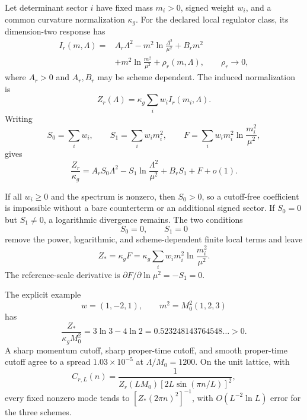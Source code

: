 Let determinant sector \(i\) have fixed mass \(m_i>0\), signed weight \(w_i\),
and a common curvature normalization \(\kappa_g\).  For the declared local
regulator class, its dimension-two response has
\begin{align}
 I_r(m,\Lambda)
={}&A_r\Lambda^2
 -m^2\ln\frac{\Lambda^2}{\mu^2}
 +B_rm^2\nonumber\\
 &+m^2\ln\frac{m^2}{\mu^2}
 +\rho_r(m,\Lambda),\qquad \rho_r\to0 ,
\label{eq:three-regulator-class}
\end{align}
where \(A_r>0\) and \(A_r,B_r\) may be scheme dependent.  The induced
normalization is
\begin{equation}
 Z_r(\Lambda)=\kappa_g\sum_iw_iI_r(m_i,\Lambda).
\label{eq:three-running-z}
\end{equation}
Writing
\begin{equation}
 S_0=\sum_iw_i,\qquad
 S_1=\sum_iw_im_i^2,\qquad
 F=\sum_iw_im_i^2\ln\frac{m_i^2}{\mu^2},
\label{eq:three-spectral-moments}
\end{equation}
gives
\begin{equation}
 \frac{Z_r}{\kappa_g}
 =A_rS_0\Lambda^2
 -S_1\ln\frac{\Lambda^2}{\mu^2}
 +B_rS_1+F+o(1).
\label{eq:three-running-decomposition}
\end{equation}

If all \(w_i\geq0\) and the spectrum is nonzero, then \(S_0>0\), so a
cutoff-free coefficient is impossible without a bare counterterm or an
additional signed sector.  If \(S_0=0\) but \(S_1\neq0\), a logarithmic
divergence remains.  The two conditions
\begin{equation}
 S_0=0,\qquad S_1=0
\label{eq:three-balance}
\end{equation}
remove the power, logarithmic, and scheme-dependent finite local terms and
leave
\begin{equation}
 Z_*=\kappa_gF
 =\kappa_g\sum_iw_im_i^2\ln\frac{m_i^2}{\mu^2}.
\label{eq:three-zstar}
\end{equation}
The reference-scale derivative is
\(\partial F/\partial\ln\mu^2=-S_1=0\).

The explicit example
\begin{equation}
 w=(1,-2,1),\qquad
 m^2=M_0^2(1,2,3)
\label{eq:three-balanced-example}
\end{equation}
has
\begin{equation}
 \frac{Z_*}{\kappa_gM_0^2}
 =3\ln3-4\ln2
 =0.523248143764548\ldots>0 .
\label{eq:three-balanced-value}
\end{equation}
A sharp momentum cutoff, sharp proper-time cutoff, and smooth proper-time
cutoff agree to a spread \(1.03\times10^{-5}\) at
\(\Lambda/M_0=1200\).  On the unit lattice, with
\begin{equation}
 C_{r,L}(n)=
 \frac1{Z_r(LM_0)[2L\sin(\pi n/L)]^2},
\label{eq:three-balanced-covariance}
\end{equation}
every fixed nonzero mode tends to
\([Z_*(2\pi n)^2]^{-1}\), with
\(O(L^{-2}\ln L)\) error for the three schemes.

